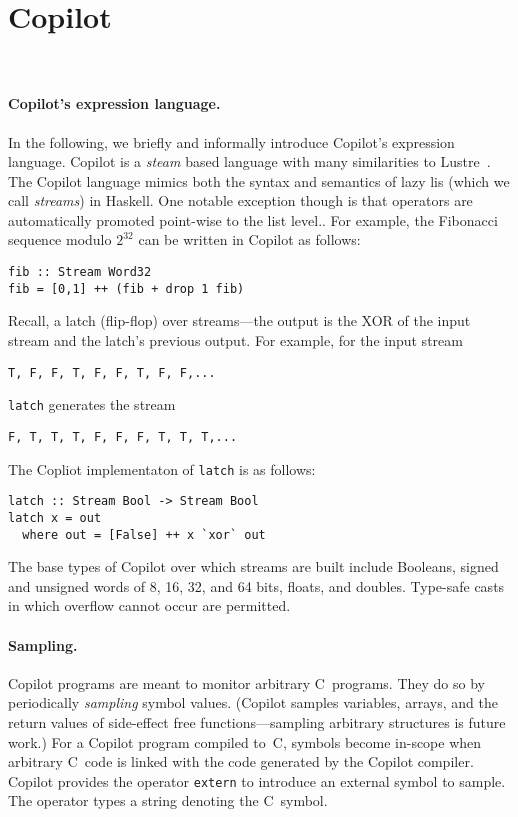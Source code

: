 \section{Copilot}~\label{sec:co-intro} 


\paragraph{Copilot's expression language.}
In the following, we briefly and informally introduce Copilot's expression
language. Copilot is a \emph{steam} based language with many similarities to Lustre~\cite{lustre}.
 The Copilot language mimics both the syntax and semantics of lazy lis (which we
call \emph{streams}) in Haskell.  One notable exception though is that
operators are automatically promoted point-wise to the list level..  For
example, the Fibonacci sequence modulo $2^{32}$ can be written in Copilot as follows:

\begin{lstlisting}[frame=single]
fib :: Stream Word32
fib = [0,1] ++ (fib + drop 1 fib)
\end{lstlisting}
%
Recall, a 
latch (flip-flop) over streams---the output is the XOR of the input stream and
the latch's previous output.  For example, for the input stream
%
\begin{lstlisting}
T, F, F, T, F, F, T, F, F,...
\end{lstlisting}
%
{\tt latch} generates the stream
\begin{lstlisting}
F, T, T, T, F, F, F, T, T, T,...
\end{lstlisting}
%
The Copliot implementaton of {\tt latch} is as follows:
%
\begin{lstlisting}[frame=single]
latch :: Stream Bool -> Stream Bool
latch x = out
  where out = [False] ++ x `xor` out
\end{lstlisting}
%
The base types of Copilot over which streams are built include Booleans, signed
and unsigned words of 8, 16, 32, and 64 bits, floats, and doubles. Type-safe
casts in which overflow cannot occur are permitted.

\paragraph{Sampling.}
Copilot programs are meant to monitor arbitrary C~programs.  They do
so by
periodically \emph{sampling} symbol values. (Copilot samples variables, arrays,
and the return values of side-effect free functions---sampling arbitrary
structures is future work.)  For a Copilot program compiled to~C, symbols become
in-scope when arbitrary C~code is linked with the code generated by the Copilot
compiler.  Copilot provides the operator {\tt extern} to introduce an external
symbol to sample.  The operator types a string denoting the C~symbol.

